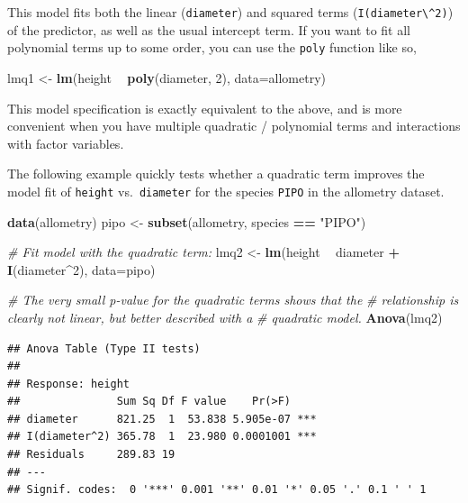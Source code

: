 \documentclass[]{book}
\newenvironment{Shaded}{\begin{snugshade}}{\end{snugshade}}
\newcommand{\CommentTok}[1]{\textcolor[rgb]{0.56,0.35,0.01}{\textit{#1}}}
\newcommand{\DataTypeTok}[1]{\textcolor[rgb]{0.13,0.29,0.53}{#1}}
\newcommand{\DecValTok}[1]{\textcolor[rgb]{0.00,0.00,0.81}{#1}}
\newcommand{\KeywordTok}[1]{\textcolor[rgb]{0.13,0.29,0.53}{\textbf{#1}}}
\newcommand{\NormalTok}[1]{#1}
\newcommand{\OperatorTok}[1]{\textcolor[rgb]{0.81,0.36,0.00}{\textbf{#1}}}
\newcommand{\StringTok}[1]{\textcolor[rgb]{0.31,0.60,0.02}{#1}}
\begin{document}
This model fits both the linear (\texttt{diameter}) and squared terms (\texttt{I(diameter\textbackslash{}\^{}2)}) of the predictor, as well as the usual intercept term. If you want to fit all polynomial terms up to some order, you can use the \texttt{poly} function like so,

\begin{Shaded}
\begin{Highlighting}[]
\NormalTok{lmq1 <-}\StringTok{ }\KeywordTok{lm}\NormalTok{(height }\OperatorTok{~}\StringTok{ }\KeywordTok{poly}\NormalTok{(diameter, }\DecValTok{2}\NormalTok{), }\DataTypeTok{data=}\NormalTok{allometry)}
\end{Highlighting}
\end{Shaded}

This model specification is exactly equivalent to the above, and is more convenient when you have multiple quadratic / polynomial terms and interactions with factor variables.

The following example quickly tests whether a quadratic term improves the model fit of \texttt{height} vs.~\texttt{diameter} for the species \texttt{PIPO} in the allometry dataset.

\begin{Shaded}
\begin{Highlighting}[]
\KeywordTok{data}\NormalTok{(allometry)}
\NormalTok{pipo <-}\StringTok{ }\KeywordTok{subset}\NormalTok{(allometry, species }\OperatorTok{==}\StringTok{ "PIPO"}\NormalTok{)}

\CommentTok{# Fit model with the quadratic term:}
\NormalTok{lmq2 <-}\StringTok{ }\KeywordTok{lm}\NormalTok{(height }\OperatorTok{~}\StringTok{ }\NormalTok{diameter }\OperatorTok{+}\StringTok{ }\KeywordTok{I}\NormalTok{(diameter}\OperatorTok{^}\DecValTok{2}\NormalTok{), }\DataTypeTok{data=}\NormalTok{pipo)}

\CommentTok{# The very small p-value for the quadratic terms shows that the }
\CommentTok{# relationship is clearly not linear, but better described with a }
\CommentTok{# quadratic model.}
\KeywordTok{Anova}\NormalTok{(lmq2)}
\end{Highlighting}
\end{Shaded}

\begin{verbatim}
## Anova Table (Type II tests)
## 
## Response: height
##               Sum Sq Df F value    Pr(>F)    
## diameter      821.25  1  53.838 5.905e-07 ***
## I(diameter^2) 365.78  1  23.980 0.0001001 ***
## Residuals     289.83 19                      
## ---
## Signif. codes:  0 '***' 0.001 '**' 0.01 '*' 0.05 '.' 0.1 ' ' 1
\end{verbatim}
\end{document}
